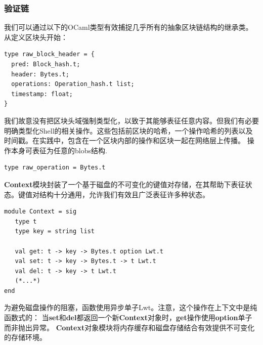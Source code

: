 \documentclass[letterpaper]{article}
\begin{document}
\subsubsection{验证链}

我们可以通过以下的OCaml类型有效捕捉几乎所有的抽象区块链结构的继承类。从定义区块头开始：
\lstset{
  language=[Objective]Caml
}
\begin{lstlisting}
type raw_block_header = {
  pred: Block_hash.t;
  header: Bytes.t;
  operations: Operation_hash.t list;
  timestamp: float;
}
\end{lstlisting}

我们故意没有把区块头域强制类型化，以致于其能够表征任意内容。但我们有必要明确类型化Shell的相关操作。这些包括前区块的哈希，一个操作哈希的列表以及时间戳。在实践中，包含在一个区块内部的操作和区块一起在网络层上传播。
操作本身可表征为任意的blobs结构.

\begin{lstlisting}
type raw_operation = Bytes.t
\end{lstlisting}

\textbf{Context}模块封装了一个基于磁盘的不可变化的键值对存储，在其帮助下表征状态。键值对结构十分通用，允许我们有效且广泛表征许多种状态。

\begin{lstlisting}
module Context = sig
   type t
   type key = string list

   val get: t -> key -> Bytes.t option Lwt.t
   val set: t -> key -> Bytes.t -> t Lwt.t
   val del: t -> key -> t Lwt.t
   (*...*)
end
\end{lstlisting}

为避免磁盘操作的阻塞，函数使用异步单子Lwt\cite{LWT}。注意，这个操作在上下文中是纯函数式的：
当\textbf{set}和\textbf{del}都返回一个新\textbf{Context}对象时，\textbf{get}操作使用\textbf{option}单子而非抛出异常。
\textbf{Context}对象模块将内存缓存和磁盘存储结合有效提供不可变化的存储环境。
\end{document}
